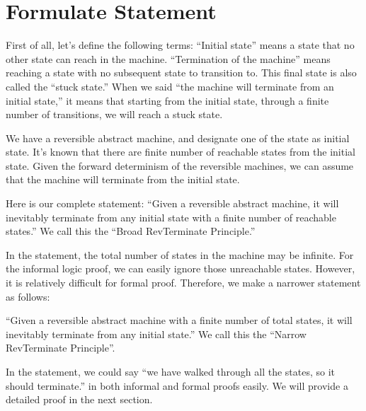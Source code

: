 \section{Formulate Statement}

First of all, let’s define the following terms:
``Initial state'' means a state that no other state can reach in the machine.
``Termination of the machine'' means reaching a state with no subsequent state to transition to. This final state is also called the ``stuck state.''
When we said ``the machine will terminate from an initial state,'' it means that starting from the initial state, through a finite number of transitions, we will reach a stuck state.

We have a reversible abstract machine, and designate one of the state as initial state.  
It's known that there are finite number of reachable states from the initial state.  
Given the forward determinism of the reversible machines, we can assume that the machine will terminate from the initial state.

Here is our complete statement:
``Given a reversible abstract machine, it will inevitably terminate from any initial state with a finite number of reachable states.''
We call this the ``Broad RevTerminate Principle.''

In the statement, the total number of states in the machine may be infinite.
For the informal logic proof, we can easily ignore those unreachable states.  
However, it is relatively difficult for formal proof. 
Therefore, we make a narrower statement as follows:

``Given a reversible abstract machine with a finite number of total states, it will inevitably terminate from any initial state.''
We call this the ``Narrow RevTerminate Principle''.

In the statement, we could say ``we have walked through all the states, so it should terminate.'' in both informal and formal proofs easily.
We will provide a detailed proof in the next section.
